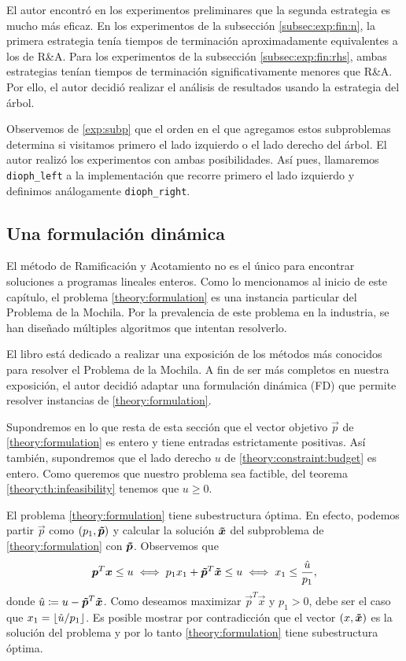 El autor encontró en los experimentos preliminares que la segunda estrategia es mucho más eficaz. En
los experimentos de la subsección \ref{subsec:exp:fin:n}, la primera estrategia tenía tiempos de
terminación aproximadamente equivalentes a los de R\&A. Para los experimentos
de la subsección \ref{subsec:exp:fin:rhs}, ambas estrategias tenían tiempos de terminación
significativamente menores que R\&A. Por ello, el autor decidió realizar el
análisis de resultados usando la estrategia del árbol.

Observemos de  \eqref{exp:subp} que el orden en el que agregamos estos subproblemas determina si
visitamos primero el lado izquierdo o el lado derecho del árbol. El autor realizó los experimentos
con ambas posibilidades. Así pues, llamaremos \texttt{dioph\_left} a la implementación que recorre
primero el lado izquierdo y definimos análogamente \texttt{dioph\_right}.

\subsection{Una formulación dinámica}
\label{subsec:fin:dp}
\noindent
El método de Ramificación y Acotamiento no es el único para encontrar
soluciones a programas lineales enteros. Como lo mencionamos al inicio de este capítulo, el problema
\eqref{theory:formulation} es una instancia particular del Problema de la Mochila. Por la
prevalencia de este problema en la industria, se han diseñado múltiples algoritmos que
intentan resolverlo.

El libro \cite{martello} está dedicado a realizar una exposición de los métodos más
conocidos para resolver el Problema de la Mochila. A fin de ser más completos en nuestra exposición,
el autor decidió adaptar una formulación dinámica (FD) que permite resolver instancias de
\eqref{theory:formulation}.

Supondremos en lo que resta de esta sección que el vector objetivo $\vec{p}$ de \eqref{theory:formulation} es
entero y tiene entradas estrictamente positivas. Así también, supondremos que el lado derecho $u$ de
\eqref{theory:constraint:budget} es entero. Como queremos que nuestro problema sea factible, del
teorema \ref{theory:th:infeasibility} tenemos que $u \geq 0$.

El problema \eqref{theory:formulation} tiene subestructura óptima. En efecto, podemos partir
$\vec{p}$ como
$(p_1, \boldsymbol{\tilde{p}})$ y calcular la solución $\boldsymbol{\tilde{x}}$ del subproblema de
\eqref{theory:formulation} con $\boldsymbol{\tilde{p}}$. Observemos que
\begin{equation*}
	\boldsymbol{p}^T\boldsymbol{x} \leq u \iff p_1x_1 + \boldsymbol{\tilde{p}}^T\boldsymbol{\tilde{x}} \leq u \iff x_1 \leq
	\frac{\hat{u}}{p_1},
\end{equation*}
donde $\hat{u} \coloneq u - \boldsymbol{\tilde{p}}^T\boldsymbol{\tilde{x}}$. Como deseamos maximizar
$\vec{p}^T\vec{x}$ y $p_1 > 0$, debe ser el caso que $x_1 = \left\lfloor \hat{u}/p_1 \right\rfloor$. Es posible mostrar
por contradicción que el vector $(x, \boldsymbol{\tilde{x}})$ es la solución del problema y por lo tanto
\eqref{theory:formulation} tiene subestructura óptima.

